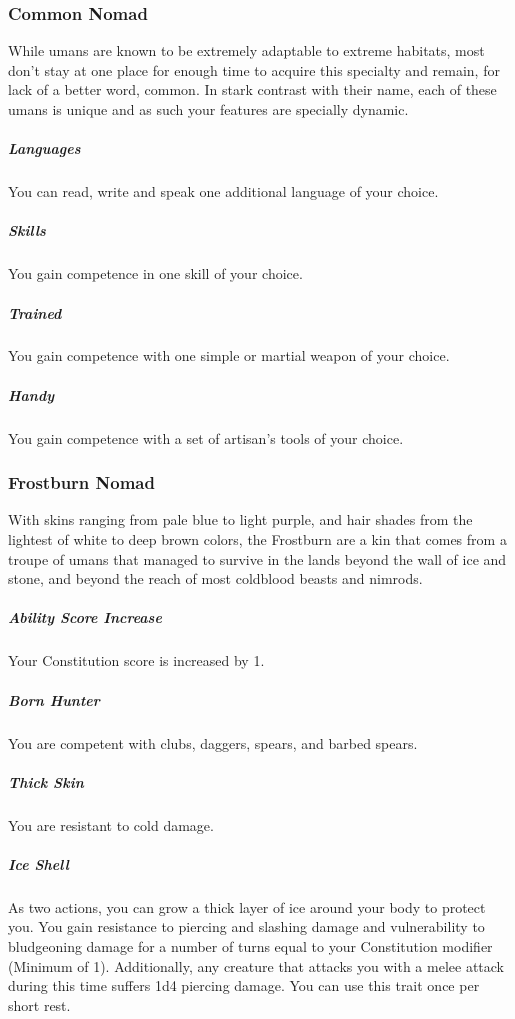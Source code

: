 \subsubsection{Common Nomad}
While umans are known to be extremely adaptable to extreme habitats, most don't stay at one place for enough time to acquire this specialty and remain, for lack of a better word, common.
In stark contrast with their name, each of these umans is unique and as such your features are specially dynamic.

\subparagraph{Languages} You can read, write and speak one additional language of your choice.

\subparagraph{Skills} You gain competence in one skill of your choice.

\subparagraph{Trained} You gain competence with one simple or martial weapon of your choice.

\subparagraph{Handy} You gain competence with a set of artisan's tools of your choice.


\subsubsection{Frostburn Nomad}
With skins ranging from pale blue to light purple, and hair shades from the lightest of white to deep brown colors, the Frostburn are a kin that comes from a troupe of umans that managed to survive in the lands beyond the wall of ice and stone, and beyond the reach of most coldblood beasts and nimrods.

\subparagraph{Ability Score Increase} Your Constitution score is increased by 1.


\subparagraph{Born Hunter} You are competent with clubs, daggers, spears, and barbed spears.

\subparagraph{Thick Skin} %
You are resistant to cold damage.%

\subparagraph{Ice Shell} As two actions, you can grow a thick layer of ice around your body to protect you.
You gain resistance to piercing and slashing damage and vulnerability to bludgeoning damage for a number of turns equal to your Constitution modifier (Minimum of 1).
Additionally, any creature that attacks you with a melee attack during this time suffers 1d4 piercing damage.
You can use this trait once per short rest.

